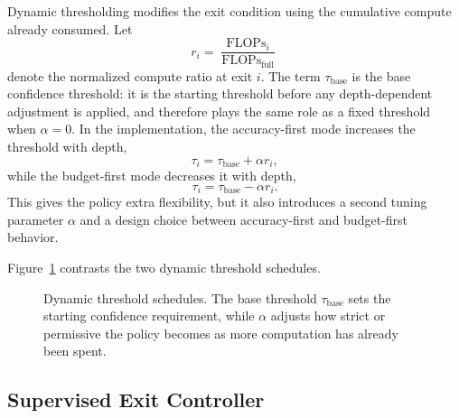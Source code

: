 \documentclass[10pt,twocolumn]{article}
\begin{document}
Dynamic thresholding modifies the exit condition using the cumulative compute already consumed. Let
\begin{equation}
    r_i =
    \frac{\operatorname{FLOPs}_i}
    {\operatorname{FLOPs}_{\text{full}}}
\end{equation}
denote the normalized compute ratio at exit $i$. The term $\tau_{\text{base}}$ is the base confidence threshold: it is the starting threshold before any depth-dependent adjustment is applied, and therefore plays the same role as a fixed threshold when $\alpha = 0$. In the implementation, the accuracy-first mode increases the threshold with depth,
\begin{equation}
    \tau_i = \tau_{\text{base}} + \alpha r_i,
\end{equation}
while the budget-first mode decreases it with depth,
\begin{equation}
    \tau_i = \tau_{\text{base}} - \alpha r_i.
\end{equation}
This gives the policy extra flexibility, but it also introduces a second tuning parameter $\alpha$ and a design choice between accuracy-first and budget-first behavior.

Figure~\ref{fig:dynamic-schedule} contrasts the two dynamic threshold schedules.

\begin{figure}[!tbp]
    \centering
    \caption{Dynamic threshold schedules. The base threshold $\tau_{\text{base}}$ sets the starting confidence requirement, while $\alpha$ adjusts how strict or permissive the policy becomes as more computation has already been spent.}
    \label{fig:dynamic-schedule}
\end{figure}

\subsection{Supervised Exit Controller}
\end{document}

